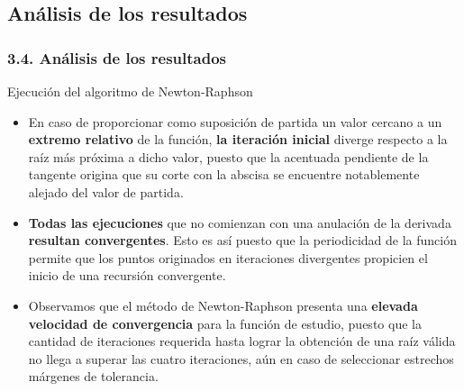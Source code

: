 \documentclass{beamer}
\begin{document}

\subsection{Análisis de los resultados}
\begin{frame}
\frametitle{3.4. Análisis de los resultados}
\begin{block}{Ejecución del algoritmo de Newton-Raphson}

\begin{itemize}
    \item
      En caso de proporcionar como suposición de partida un valor cercano a un \textbf
      {extremo relativo} de la función, \textbf{la iteración inicial} diverge respecto 
      a la raíz más próxima a dicho valor, puesto que la acentuada pendiente de la tangente 
      origina que su corte con la abscisa se encuentre notablemente alejado del valor de partida.
      \pause
      \vspace*{-0.1cm}
    \item
      \textbf{Todas las ejecuciones} que no comienzan con una anulación de la derivada \textbf
      {resultan convergentes}. Esto es así puesto que la periodicidad de la función permite que 
      los puntos originados en iteraciones divergentes propicien el inicio de una recursión 
      convergente.
      \pause
      \vspace*{-0.1cm}
    \item
      Observamos que el método de Newton-Raphson presenta una \textbf{elevada velocidad de 
      convergencia} para la función de estudio, puesto que la cantidad de iteraciones requerida 
      hasta lograr la obtención de una raíz válida no llega a superar las cuatro iteraciones, 
      aún en caso de seleccionar estrechos márgenes de tolerancia.  
\end{itemize}

\end{block}
\end{frame} 

\end{document}
